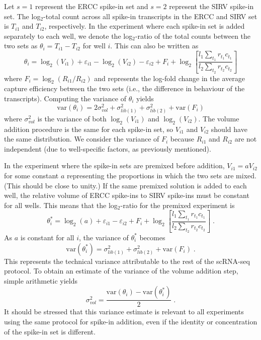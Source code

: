 \documentclass{article}
\newcommand\variance{\mbox{var}}
\begin{document}
Let $s=1$ represent the ERCC spike-in set and $s=2$ represent the SIRV spike-in set.
The log$_2$-total count across all spike-in transcripts in the ERCC and SIRV set is $T_{i1}$ and $T_{i2}$, respectively.
In the experiment where each spike-in set is added separately to each well, we denote the log$_2$-ratio of the total counts between the two sets as $\theta_i = T_{i1} - T_{i2}$ for well $i$.
This can also be written as
\[
    \theta_i = \log_2(V_{i1}) + \varepsilon_{i1} - \log_2(V_{i2}) - \varepsilon_{i2} + F_i + \log_2\left[ \frac{l_1 \sum_{t_1} r_{t_1} c_{t_1}}{l_2\sum_{t_2} r_{t_2} c_{t_2}} \right]
\]
where $F_i = \log_2(R_{i1}/R_{i2})$ and represents the log-fold change in the average capture efficiency between the two sets (i.e., the difference in behaviour of the transcripts).
Computing the variance of $\theta_i$ yields
\[
\variance(\theta_i) = 2 \sigma^2_{vol} + \sigma^2_{lib(1)} + \sigma^2_{lib(2)} + \variance(F_i)
\]
where $\sigma^2_{vol}$ is the variance of both $\log_2(V_{i1})$ and $\log_2(V_{i2})$.
The volume addition procedure is the same for each spike-in set, so $V_{i1}$ and $V_{i2}$ should have the same distribution.
We consider the variance of $F_i$ because $R_{i1}$ and $R_{i2}$ are not independent (due to well-specific factors, as previously mentioned).

In the experiment where the spike-in sets are premixed before addition, $V_{i1}=aV_{i2}$ for some constant $a$ representing the proportions in which the two sets are mixed.
(This should be close to unity.)
If the same premixed solution is added to each well, the relative volume of ERCC spike-ins to SIRV spike-ins must be constant for all wells.
This means that the log$_2$-ratio for the premixed experiment is 
\[
    \theta^*_i = \log_2(a) + \varepsilon_{i1} - \varepsilon_{i2} + F_i + \log_2\left[ \frac{l_1 \sum_{t_1} r_{t_1} c_{t_1}}{l_2\sum_{t_2} r_{t_2} c_{t_2}} \right] \;.
\]
As $a$ is constant for all $i$, the variance of $\theta^*_i$ becomes
\[
\variance(\theta^*_i) = \sigma^2_{lib(1)} + \sigma^2_{lib(2)} + \variance(F_i) \;.
\]
This represents the technical variance attributable to the rest of the scRNA-seq protocol.
To obtain an estimate of the variance of the volume addition step, simple arithmetic yields
\[
\sigma^2_{vol} = \frac{\variance(\theta_i) - \variance(\theta^*_i)}{2} \;.
\]
It should be stressed that this variance estimate is relevant to all experiments using the same protocol for spike-in addition, even if the identity or concentration of the spike-in set is different.
\end{document}
